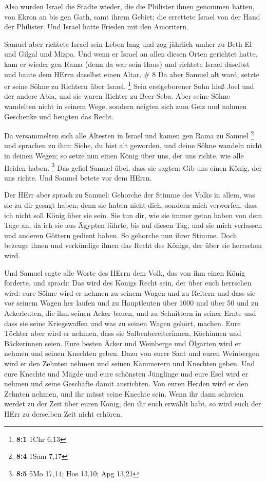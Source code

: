  Also wurden Israel die Städte wieder, die die Philister
ihnen genommen hatten, von Ekron an bis gen Gath, samt ihrem Gebiet; die
errettete Israel von der Hand der Philister. Und Israel hatte Frieden
mit den Amoritern.

 Samuel aber richtete Israel sein Leben lang 
und zog jährlich umher zu Beth-El und Gilgal und Mizpa. Und wenn er
Israel an allen diesen Orten gerichtet hatte,  kam er
wieder gen Rama (denn da war sein Haus) und richtete Israel daselbst und
baute dem HErrn daselbst einen Altar. \# 8  Da aber Samuel
alt ward, setzte er seine Söhne zu Richtern über Israel. \footnote{\textbf{8:1}
  1Chr 6,13}  Sein erstgeborener Sohn hieß Joel und der
andere Abia, und sie waren Richter zu Beer-Seba.  Aber seine
Söhne wandelten nicht in seinem Wege, sondern neigten sich zum Geiz und
nahmen Geschenke und beugten das Recht.

 Da versammelten sich alle Ältesten in Israel und kamen gen
Rama zu Samuel \footnote{\textbf{8:4} 1Sam 7,17}  und
sprachen zu ihm: Siehe, du bist alt geworden, und deine Söhne wandeln
nicht in deinen Wegen; so setze nun einen König über uns, der uns
richte, wie alle Heiden haben. \footnote{\textbf{8:5} 5Mo 17,14; Hos
  13,10; Apg 13,21}  Das gefiel Samuel übel, dass sie
sagten: Gib uns einen König, der uns richte. Und Samuel betete vor dem
HErrn.

 Der HErr aber sprach zu Samuel: Gehorche der Stimme des
Volks in allem, was sie zu dir gesagt haben; denn sie haben nicht dich,
sondern mich verworfen, dass ich nicht soll König über sie sein.
 Sie tun dir, wie sie immer getan haben von dem Tage an, da
ich sie aus Ägypten führte, bis auf diesen Tag, und sie mich verlassen
und anderen Göttern gedient haben.  So gehorche nun ihrer
Stimme. Doch bezeuge ihnen und verkündige ihnen das Recht des Königs,
der über sie herrschen wird.

 Und Samuel sagte alle Worte des HErrn dem Volk, das von
ihm einen König forderte,  und sprach: Das wird des Königs
Recht sein, der über euch herrschen wird: eure Söhne wird er nehmen zu
seinem Wagen und zu Reitern und dass sie vor seinem Wagen her laufen
 und zu Hauptleuten über 1000 und über 50 und zu
Ackerleuten, die ihm seinen Acker bauen, und zu Schnittern in seiner
Ernte und dass sie seine Kriegswaffen und was zu seinen Wagen gehört,
machen.  Eure Töchter aber wird er nehmen, dass sie
Salbenbereiterinnen, Köchinnen und Bäckerinnen seien.  Eure
besten Äcker und Weinberge und Ölgärten wird er nehmen und seinen
Knechten geben.  Dazu von eurer Saat und euren Weinbergen
wird er den Zehnten nehmen und seinen Kämmerern und Knechten geben.
 Und eure Knechte und Mägde und eure schönsten Jünglinge
und eure Esel wird er nehmen und seine Geschäfte damit ausrichten.
 Von euren Herden wird er den Zehnten nehmen, und ihr müsst
seine Knechte sein.  Wenn ihr dann schreien werdet zu der
Zeit über euren König, den ihr euch erwählt habt, so wird euch der HErr
zu derselben Zeit nicht erhören.


